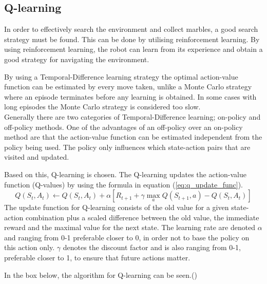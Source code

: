 \documentclass[../Head/Main.tex]{subfiles}
\begin{document}
\subsection{Q-learning}
In order to effectively search the environment and collect marbles, a good search strategy must be found. This can be done by utilising reinforcement learning. By using reinforcement learning, the robot can learn from its experience and obtain a good strategy for navigating the environment.\par
By using a Temporal-Difference learning strategy the optimal action-value function can be estimated by every move taken, unlike a Monte Carlo strategy where an episode terminates before any learning is obtained. In some cases with long episodes the Monte Carlo strategy is considered too slow.\\
Generally there are two categories of Temporal-Difference learning; on-policy and off-policy methods. One of the advantages of an off-policy over an on-policy method are that the action-value function can be estimated independent from the policy being used. The policy only influences which state-action pairs that are visited and updated.\par 
Based on this, Q-learning is chosen. The Q-learning updates the action-value function (Q-values) by using the formula in equation (\ref{eq:q_update_func}).
\begin{equation}\label{eq:q_update_func}
Q\left(S_t,A_t\right) \leftarrow Q\left(S_t,A_t\right) + \alpha\left[R_{t+1}+\gamma\max_a Q\left(S_{t+1},a\right)-Q\left(S_t,A_t\right)\right]
\end{equation}
The update function for Q-learning consists of the old value for a given state-action combination plus a scaled difference between the old value, the immediate reward and the maximal value for the next state. The learning rate are denoted $\alpha$ and ranging from 0-1 preferable closer to 0, in order not to base the policy on this action only. $\gamma$ denotes the discount factor and is also ranging from 0-1, preferable closer to 1, to ensure that future actions matter.\par
In the box below, the algorithm for Q-learning can be seen.(\cite[p. 131-136]{RL})

\end{document}

